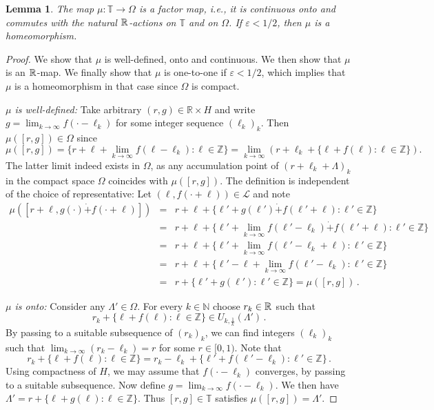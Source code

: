 \documentclass[11pt, a4wide]{amsart}
\newcommand{\ts}{\hspace{0.5pt}}
\newcommand{\RR}{\mathbb{R}\ts}
\newcommand{\ZZ}{\mathbb{Z}}
\newcommand{\NN}{\mathbb{N}}
\newcommand{\TT}{\mathbb{T}}
\newcommand{\LL}{\mathcal{L}}
\newtheorem{lemma}{Lemma}
\numberwithin{lemma}{section}
\begin{document}
\smallskip

%
\begin{lemma}
The map $\mu: \TT\to \Omega$ is a factor map, i.e., it is continuous onto and commutes with the natural $\RR$-actions on $\TT$ and on $\Omega$.  If $\varepsilon<1/2$, then $\mu$ is a homeomorphism.
\end{lemma}


\begin{proof}

We show that $\mu$ is well-defined, onto and continuous. We then show that  $\mu$ is an $\RR$-map. We finally show that $\mu$ is one-to-one if $\varepsilon<1/2$, which implies that $\mu$ is a homeomorphism in that case since $\Omega$ is compact.

\smallskip

\noindent \textit{$\mu$ is well-defined:} Take arbitrary $(r,g)\in \mathbb R\times H$ and write $g=\lim_{k\to\infty} f(\cdot-\ell_k)$ for some integer sequence $(\ell_k)_k$.  Then $\mu([r,g])\in \Omega$ since
%
\begin{displaymath}
\mu([r,g]) = \{r+\ell+\lim_{k\to\infty} f(\ell-\ell_k):\ell \in \ZZ\}=\lim_{k\to\infty}\left(  r+\ell_k+ \{\ell+f(\ell):\ell \in \ZZ\}\right).
\end{displaymath}
%
The latter limit indeed exists in $\Omega$, as any accumulation point of $\left( r+\ell_k+ \Lambda\right)_k$ in the compact space $\Omega$ coincides with $\mu([r,g])$.
The definition is independent of the choice of representative: Let $(\ell, f(\cdot + \ell))\in \LL$ and note
%
\begin{eqnarray*}
\mu([r+\ell, g(\cdot) \dot{+} f(\cdot + \ell)]) & = & r+\ell+\{\ell'+g(\ell') \dot{+} f(\ell'+\ell) : \ell' \in \ZZ\} \\
& = & r+\ell+\{\ell'+ \lim_{k \to \infty} f(\ell'-\ell_k) \dot{+} f(\ell'+\ell) : \ell' \in \ZZ\} \\
& = & r+\ell+\{\ell'+ \lim_{k \to \infty} f(\ell'-\ell_k + \ell) : \ell' \in \ZZ\} \\
& = & r+\ell+\{\ell' - \ell + \lim_{k \to \infty} f(\ell'-\ell_k) : \ell' \in \ZZ\} \\
& = & r+\{\ell' + g(\ell') : \ell' \in \ZZ\} = \mu([r, g])\,.
\end{eqnarray*}
%

\noindent \textit{$\mu$ is onto:}
Consider any $\Lambda' \in \Omega$. For every $k \in \NN$ choose $r_k \in \RR$ such that
%
\[
r_k + \{\ell+ f(\ell): \ell \in \ZZ\} \in U_{k,\frac{1}{k}}(\Lambda')\,.
\]
%
By passing to a suitable subsequence of $(r_k)_k$, we can find integers $(\ell_{k})_k$ such that $\lim_{k \to \infty} (r_{k} - \ell_{k}) = r$ for some $r \in [0,1)$. Note that
%
\[
r_{k} + \{\ell + f(\ell) : \ell \in \ZZ \} = r_{k} - \ell_{k} + \{\ell' + f(\ell' - \ell_{k}) : \ell' \in \ZZ \}\,.
\]
%
Using compactness of $H$, we may assume that $f(\cdot -  \ell_{k})$ converges,
by passing to a suitable subsequence. Now define $g = \lim_{k \to \infty} f(\cdot - \ell_{k})$. We then have
$\Lambda' = r + \{\ell+ g(\ell): \ell \in \ZZ\}$.
Thus $[r, g]\in \TT$ satisfies $\mu([r, g]) = \Lambda'$.


\end{proof}
\end{document}
